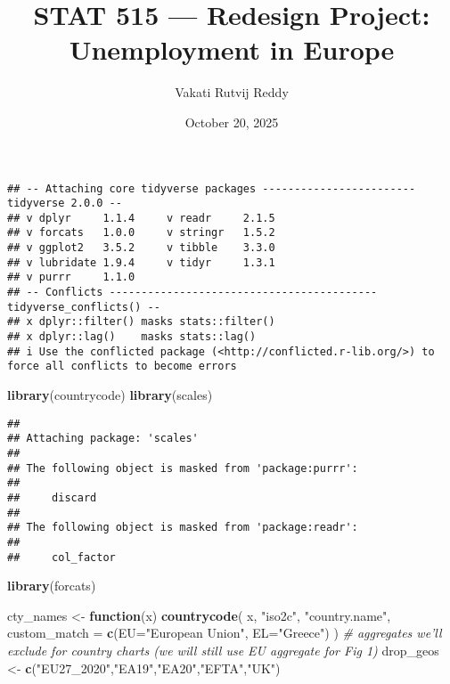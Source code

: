 \documentclass[
]{article}
\title{STAT 515 --- Redesign Project: Unemployment in Europe}
\author{Vakati Rutvij Reddy}
\date{October 20, 2025}
\newenvironment{Shaded}{\begin{snugshade}}{\end{snugshade}}
\newcommand{\AttributeTok}[1]{\textcolor[rgb]{0.13,0.29,0.53}{#1}}
\newcommand{\CommentTok}[1]{\textcolor[rgb]{0.56,0.35,0.01}{\textit{#1}}}
\newcommand{\ConstantTok}[1]{\textcolor[rgb]{0.56,0.35,0.01}{#1}}
\newcommand{\ControlFlowTok}[1]{\textcolor[rgb]{0.13,0.29,0.53}{\textbf{#1}}}
\newcommand{\FunctionTok}[1]{\textcolor[rgb]{0.13,0.29,0.53}{\textbf{#1}}}
\newcommand{\NormalTok}[1]{#1}
\newcommand{\OtherTok}[1]{\textcolor[rgb]{0.56,0.35,0.01}{#1}}
\newcommand{\SpecialCharTok}[1]{\textcolor[rgb]{0.81,0.36,0.00}{\textbf{#1}}}
\newcommand{\StringTok}[1]{\textcolor[rgb]{0.31,0.60,0.02}{#1}}
\begin{document}
\maketitle

\begin{Shaded}
\end{Shaded}

\begin{verbatim}
## -- Attaching core tidyverse packages ------------------------ tidyverse 2.0.0 --
## v dplyr     1.1.4     v readr     2.1.5
## v forcats   1.0.0     v stringr   1.5.2
## v ggplot2   3.5.2     v tibble    3.3.0
## v lubridate 1.9.4     v tidyr     1.3.1
## v purrr     1.1.0     
## -- Conflicts ------------------------------------------ tidyverse_conflicts() --
## x dplyr::filter() masks stats::filter()
## x dplyr::lag()    masks stats::lag()
## i Use the conflicted package (<http://conflicted.r-lib.org/>) to force all conflicts to become errors
\end{verbatim}

\begin{Shaded}
\begin{Highlighting}[]
\FunctionTok{library}\NormalTok{(countrycode)}
\FunctionTok{library}\NormalTok{(scales)}
\end{Highlighting}
\end{Shaded}

\begin{verbatim}
## 
## Attaching package: 'scales'
## 
## The following object is masked from 'package:purrr':
## 
##     discard
## 
## The following object is masked from 'package:readr':
## 
##     col_factor
\end{verbatim}

\begin{Shaded}
\begin{Highlighting}[]
\FunctionTok{library}\NormalTok{(forcats)}

\NormalTok{cty\_names }\OtherTok{\textless{}{-}} \ControlFlowTok{function}\NormalTok{(x) }\FunctionTok{countrycode}\NormalTok{(}
\NormalTok{  x, }\StringTok{"iso2c"}\NormalTok{, }\StringTok{"country.name"}\NormalTok{,}
  \AttributeTok{custom\_match =} \FunctionTok{c}\NormalTok{(}\AttributeTok{EU=}\StringTok{"European Union"}\NormalTok{, }\AttributeTok{EL=}\StringTok{"Greece"}\NormalTok{)}
\NormalTok{)}
\CommentTok{\# aggregates we’ll exclude for country charts (we will still use EU aggregate for Fig 1)}
\NormalTok{drop\_geos }\OtherTok{\textless{}{-}} \FunctionTok{c}\NormalTok{(}\StringTok{"EU27\_2020"}\NormalTok{,}\StringTok{"EA19"}\NormalTok{,}\StringTok{"EA20"}\NormalTok{,}\StringTok{"EFTA"}\NormalTok{,}\StringTok{"UK"}\NormalTok{)}
\end{Highlighting}
\end{Shaded}
\end{document}
